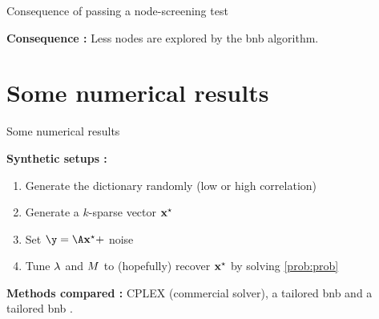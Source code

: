 \documentclass[10pt]{beamer}
\begin{document}
\begin{frame}{Consequence of passing a node-screening test}
  \begin{figure}
    \centering
    \scalebox{1}{}
  \end{figure}
  \textbf{Consequence :} Less nodes are explored by the \gls{bnb} algorithm.
\end{frame}

\section{Some numerical results}

\begin{frame}{Some numerical results}
  \newcommand{\CPLEX}{\texttt{CPLEX}}
  \newcommand{\BNB}{\texttt{BnB}}
  \newcommand{\BNBscr}{\texttt{BnB+scr}}
  \newcommand{\sparsitylevel}{k}

  \textbf{Synthetic setups :} 
  \begin{enumerate}
    \item Generate the dictionary randomly (low or high correlation)
    \item Generate a $\sparsitylevel$-sparse vector $\mathbf{x}^{\star}$
    \item Set $\obs = \dic \opt{\pv}+$ noise
    \item Tune $\lambda$ and $M$ to (hopefully) recover $\mathbf{x}^{\star}$ by solving \eqref{prob:prob}
  \end{enumerate}

  \pause

  \textbf{Methods compared :} CPLEX (commercial solver), a tailored \gls{bnb} and a tailored \gls{bnb} .

  \pause

  

\end{frame}
\end{document}
